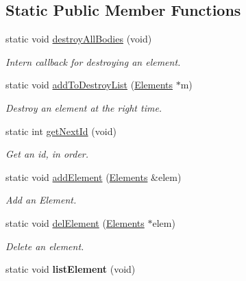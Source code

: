 \subsection*{Static Public Member Functions}
\begin{DoxyCompactItemize}
\item 
static void \hyperlink{class_game_ae391a35eb1f970669b0d6b236de4b885}{destroy\+All\+Bodies} (void)
\begin{DoxyCompactList}\small\item\em Intern callback for destroying an element. \end{DoxyCompactList}\item 
static void \hyperlink{class_game_ae3c5dc329506d37d244ef3587ac813af}{add\+To\+Destroy\+List} (\hyperlink{class_elements}{Elements} $\ast$m)
\begin{DoxyCompactList}\small\item\em Destroy an element at the right time. \end{DoxyCompactList}\item 
static int \hyperlink{class_game_aec4cafc10218eb665d67bf027ddbd3f1}{get\+Next\+Id} (void)
\begin{DoxyCompactList}\small\item\em Get an id, in order. \end{DoxyCompactList}\item 
static void \hyperlink{class_game_a10d84bf0157d5b3abf102846d5170af5}{add\+Element} (\hyperlink{class_elements}{Elements} \&elem)
\begin{DoxyCompactList}\small\item\em Add an Element. \end{DoxyCompactList}\item 
static void \hyperlink{class_game_a644e15f76310ed410817e8423ad7a5b2}{del\+Element} (\hyperlink{class_elements}{Elements} $\ast$elem)
\begin{DoxyCompactList}\small\item\em Delete an element. \end{DoxyCompactList}\item 
\hypertarget{class_game_aafc84f0b25d07825f08dffc07af73918}{static void {\bfseries list\+Element} (void)}\label{class_game_aafc84f0b25d07825f08dffc07af73918}


\end{DoxyCompactItemize}
